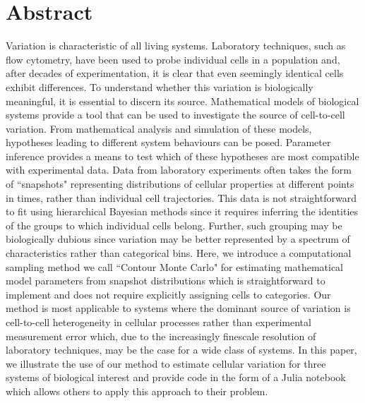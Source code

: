 \documentclass[10pt,letterpaper]{article}
\begin{document}
\newpage
\section{Abstract}
Variation is characteristic of all living systems. Laboratory techniques, such as flow cytometry, have been used to probe individual cells in a population and, after decades of experimentation, it is clear that even seemingly identical cells exhibit differences. To understand whether this variation is biologically meaningful, it is essential to discern its source. Mathematical models of biological systems provide a tool that can be used to investigate the source of cell-to-cell variation. From mathematical analysis and simulation of these models, hypotheses leading to different system behaviours can be posed. Parameter inference provides a means to test which of these hypotheses are most compatible with experimental data. Data from laboratory experiments often takes the form of ``snapshots" representing distributions of cellular properties at different points in times, rather than individual cell trajectories. This data is not straightforward to fit using hierarchical Bayesian methods since it requires inferring the identities of the groups to which individual cells belong. Further, such grouping may be biologically dubious since variation may be better represented by a spectrum of characteristics rather than categorical bins. Here, we introduce a computational sampling method we call ``Contour Monte Carlo" for estimating mathematical model parameters from snapshot distributions which is straightforward to implement and does not require explicitly assigning cells to categories. Our method is most applicable to systems where the dominant source of variation is cell-to-cell heterogeneity in cellular processes rather than experimental measurement error which, due to the increasingly finescale resolution of laboratory techniques, may be the case for a wide class of systems. In this paper, we illustrate the use of our method to estimate cellular variation for three systems of biological interest and provide code in the form of a Julia notebook which allows others to apply this approach to their problem.
\end{document}
